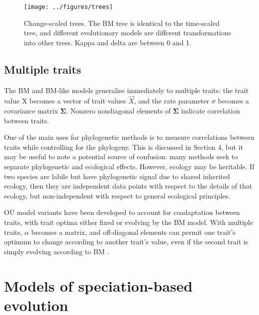 \documentclass[12pt]{article}
\begin{document}

\begin{figure}[!ht]
	\begin{center}
	\texttt{[image: ../figures/trees]}
	\end{center}
	\vspace{-40pt}	
	\caption{
		Change-scaled trees. The BM tree is identical to the time-scaled tree, and different evolutionary models are different transformations into other trees. Kappa and delta are between 0 and 1.
	}
	\label{Figure_label}
\end{figure}
\vspace{20pt}

\subsection{Multiple traits}

The BM and BM-like models generalise immediately to multiple traits: the trait value X becomes a vector of trait values $\overrightarrow{X}$, and the rate parameter $\sigma$ becomes a covariance matrix $\boldsymbol{\Sigma}$. Nonzero nondiagonal elements of $\boldsymbol{\Sigma}$ indicate correlation between traits. 

One of the main uses for phylogenetic methods is to measure correlations between traits while controlling for the phylogeny. This is discussed in Section 4, but it may be useful to note a potential source of confusion: many methods seek to separate phylogenetic and ecological effects. However, ecology may be heritable. If two species are labile but have phylogenetic signal due to shared inherited ecology, then they are independent data points with respect to the details of that ecology, but non-independent with respect to general ecological principles.
 
OU model variants have been developed to account for coadaptation between traits, with trait optima either fixed or evolving by the BM model. With multiple traits, $\alpha$ becomes a matrix, and off-diagonal elements can permit one trait's optimum to change according to another trait's value, even if the second trait is simply evolving according to BM \citep{bartoszek_phylogenetic_2012}.

\section{Models of speciation-based evolution}
\end{document}
